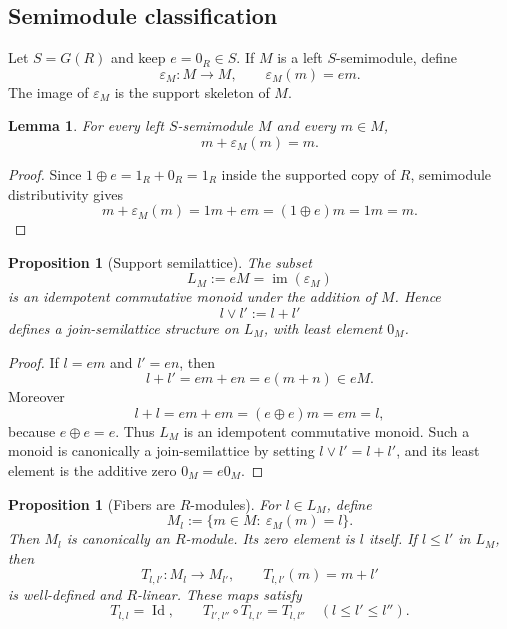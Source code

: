 \documentclass[11pt]{article}
\newcommand{\Id}{\operatorname{Id}}
\newcommand{\eps}{\varepsilon}
\theoremstyle{plain}
\newtheorem{proposition}[theorem]{Proposition}
\newtheorem{lemma}[theorem]{Lemma}
\theoremstyle{definition}
\begin{document}
\subsection{Semimodule classification}

Let \(S=G(R)\) and keep \(e=0_R\in S\).  If \(M\) is a left \(S\)-semimodule, define
\[
   \eps_M:M\to M,
   \qquad
   \eps_M(m)=em.
\]
The image of \(\eps_M\) is the support skeleton of \(M\).

\begin{lemma}\label{lem:m-plus-eps}
For every left \(S\)-semimodule \(M\) and every \(m\in M\),
\[
   m+\eps_M(m)=m.
\]
\end{lemma}

\begin{proof}
Since \(1\oplus e=1_R+0_R=1_R\) inside the supported copy of \(R\), semimodule distributivity gives
\[
   m+\eps_M(m)=1m+em=(1\oplus e)m=1m=m.
\]
\end{proof}

\begin{proposition}[Support semilattice]\label{prop:support-semilattice}
The subset
\[
   L_M:=eM=\operatorname{im}(\eps_M)
\]
is an idempotent commutative monoid under the addition of \(M\).  Hence
\[
   l\vee l':=l+l'
\]
defines a join-semilattice structure on \(L_M\), with least element \(0_M\).
\end{proposition}

\begin{proof}
If \(l=em\) and \(l'=en\), then
\[
   l+l'=em+en=e(m+n)\in eM.
\]
Moreover
\[
   l+l=em+em=(e\oplus e)m=em=l,
\]
because \(e\oplus e=e\).  Thus \(L_M\) is an idempotent commutative monoid.  Such a monoid is canonically a join-semilattice by setting \(l\vee l'=l+l'\), and its least element is the additive zero \(0_M=e0_M\).
\end{proof}

\begin{proposition}[Fibers are \(R\)-modules]\label{prop:fibers-modules}
For \(l\in L_M\), define
\[
   M_l:=\{m\in M:\ \eps_M(m)=l\}.
\]
Then \(M_l\) is canonically an \(R\)-module.  Its zero element is \(l\) itself.  If \(l\le l'\) in \(L_M\), then
\[
   T_{l,l'}:M_l\to M_{l'},
   \qquad
   T_{l,l'}(m)=m+l'
\]
is well-defined and \(R\)-linear.  These maps satisfy
\[
   T_{l,l}=\Id,
   \qquad
   T_{l',l''}\circ T_{l,l'}=T_{l,l''}
   \quad(l\le l'\le l'').
\]
\end{proposition}
\end{document}
